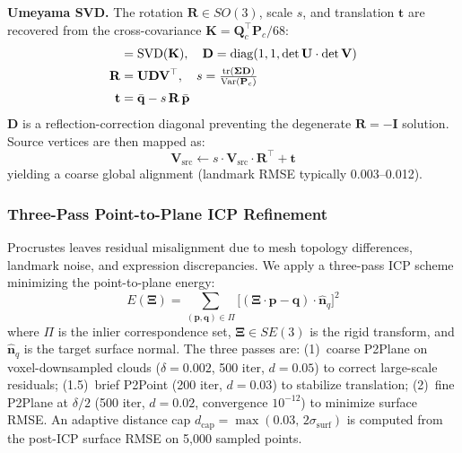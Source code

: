 \documentclass[conference]{IEEEtran}
\newcommand{\Vsrc}{\mathbf{V}_{\text{src}}}
\begin{document}
\medskip\noindent\textbf{Umeyama SVD.}
The rotation $\mathbf{R} \in SO(3)$, scale $s$, and translation $\mathbf{t}$
are recovered from the cross-covariance $\mathbf{K} = \mathbf{Q}_c^\top\mathbf{P}_c / 68$:
\begin{align}
  [\mathbf{U},\bm{\Sigma},\mathbf{V}^\top] &= \operatorname{SVD}(\mathbf{K}),\quad
  \mathbf{D} = \operatorname{diag}(1,1,\det\mathbf{U}\cdot\det\mathbf{V})
  \label{eq:svd} \\
  \mathbf{R} &= \mathbf{U}\mathbf{D}\mathbf{V}^\top,\quad
  s = \tfrac{\operatorname{tr}(\bm{\Sigma}\mathbf{D})}{\operatorname{Var}(\mathbf{P}_c)}
  \label{eq:rotation} \\
  \mathbf{t} &= \bar{\mathbf{q}} - s\,\mathbf{R}\,\bar{\mathbf{p}} \notag
\end{align}
$\mathbf{D}$ is a reflection-correction diagonal preventing the degenerate
$\mathbf{R} = -\mathbf{I}$ solution. Source vertices are then mapped as:
\begin{equation}
  \Vsrc \leftarrow s \cdot \Vsrc \cdot \mathbf{R}^\top + \mathbf{t}
  \label{eq:procrustes_apply}
\end{equation}
yielding a coarse global alignment (landmark RMSE typically 0.003--0.012).

\subsubsection{Three-Pass Point-to-Plane ICP Refinement}

Procrustes leaves residual misalignment due to mesh topology differences,
landmark noise, and expression discrepancies. We apply a three-pass ICP
scheme minimizing the point-to-plane energy:
\begin{equation}
  E(\bm{\Xi}) = \sum_{(\mathbf{p},\mathbf{q}) \in \Pi}
    \bigl[(\bm{\Xi}\cdot\mathbf{p} - \mathbf{q}) \cdot \hat{\mathbf{n}}_q\bigr]^2
  \label{eq:icp_obj}
\end{equation}
where $\Pi$ is the inlier correspondence set, $\bm{\Xi} \in SE(3)$ is the
rigid transform, and $\hat{\mathbf{n}}_q$ is the target surface normal.
The three passes are: (1)~coarse P2Plane on voxel-downsampled clouds
($\delta=0.002$, 500 iter, $d=0.05$) to correct large-scale residuals;
(1.5)~brief P2Point (200 iter, $d=0.03$) to stabilize translation;
(2)~fine P2Plane at $\delta/2$ (500 iter, $d=0.02$, convergence $10^{-12}$)
to minimize surface RMSE. An adaptive distance cap
$d_{\text{cap}} = \max(0.03,\, 2\sigma_{\text{surf}})$ is computed from the
post-ICP surface RMSE on 5,000 sampled points.
\end{document}
